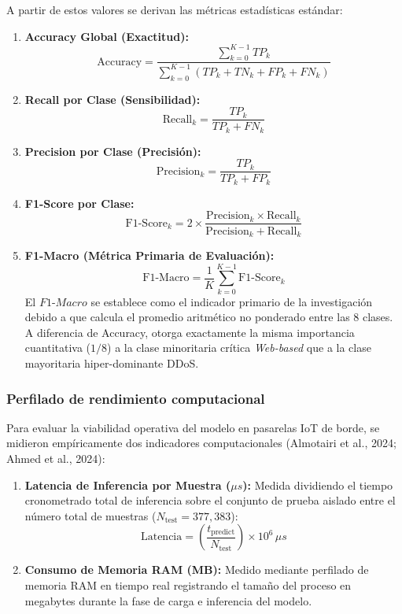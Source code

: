 A partir de estos valores se derivan las métricas estadísticas estándar:
\begin{enumerate}
    \item \textbf{Accuracy Global (Exactitud):}
    \begin{equation}
    \mathrm{Accuracy} = \frac{\sum_{k=0}^{K-1} TP_k}{\sum_{k=0}^{K-1} (TP_k + TN_k + FP_k + FN_k)}
    \end{equation}
    \item \textbf{Recall por Clase (Sensibilidad):}
    \begin{equation}
    \mathrm{Recall}_k = \frac{TP_k}{TP_k + FN_k}
    \end{equation}
    \item \textbf{Precision por Clase (Precisión):}
    \begin{equation}
    \mathrm{Precision}_k = \frac{TP_k}{TP_k + FP_k}
    \end{equation}
    \item \textbf{F1-Score por Clase:}
    \begin{equation}
    \mathrm{F1\text{-}Score}_k = 2 \times \frac{\mathrm{Precision}_k \times \mathrm{Recall}_k}{\mathrm{Precision}_k + \mathrm{Recall}_k}
    \end{equation}
    \item \textbf{F1-Macro (Métrica Primaria de Evaluación):}
    \begin{equation}
    \mathrm{F1\text{-}Macro} = \frac{1}{K} \sum_{k=0}^{K-1} \mathrm{F1\text{-}Score}_k
    \end{equation}
    El $F1\text{-}Macro$ se establece como el indicador primario de la investigación debido a que calcula el promedio aritmético no ponderado entre las 8 clases. A diferencia de Accuracy, otorga exactamente la misma importancia cuantitativa ($1/8$) a la clase minoritaria crítica \textit{Web-based} que a la clase mayoritaria hiper-dominante DDoS.
\end{enumerate}

\subsubsection{Perfilado de rendimiento computacional}
Para evaluar la viabilidad operativa del modelo en pasarelas IoT de borde, se midieron empíricamente dos indicadores computacionales (Almotairi et al., 2024; Ahmed et al., 2024):
\begin{enumerate}
    \item \textbf{Latencia de Inferencia por Muestra ($\mu s$):} Medida dividiendo el tiempo cronometrado total de inferencia sobre el conjunto de prueba aislado entre el número total de muestras ($N_{\mathrm{test}} = 377,383$):
    \begin{equation}
    \mathrm{Latencia} = \left( \frac{t_{\mathrm{predict}}}{N_{\mathrm{test}}} \right) \times 10^6 \, \mu s
    \end{equation}
    \item \textbf{Consumo de Memoria RAM (MB):} Medido mediante perfilado de memoria RAM en tiempo real registrando el tamaño del proceso en megabytes durante la fase de carga e inferencia del modelo.
\end{enumerate}

